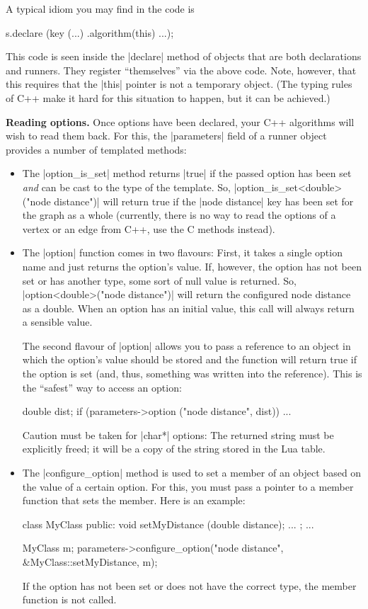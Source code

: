 A typical idiom you may find in the code is
\begin{codeexample}
s.declare (key (...)
           .algorithm(this)
           ...);  
\end{codeexample}
This code is seen inside the |declare| method of objects that are both
declarations and runners. They register ``themselves'' via the above
code. Note, however, that this requires that the |this| pointer is not
a temporary object. (The typing rules of C++ make it hard for this
situation to happen, but it can be achieved.)


\medskip
\noindent\textbf{Reading options.}
Once options have been declared, your C++ algorithms will wish to read
them back. For this, the |parameters| field of a runner object
provides a number of templated methods:
\begin{itemize}
\item The |option_is_set| method returns |true| if the passed option
  has been set \emph{and} can be cast to the type of the template. So,
  |option_is_set<double>("node distance")| will return true if the
  |node distance| key has been set for the graph as a whole
  (currently, there is no way to read the options of a vertex or an
  edge from C++, use the C methods instead).
\item The |option| function comes in two flavours: First, it takes a
  single option name and just returns the option's value. If, however,
  the option has not been set or has another type, some sort of null
  value is returned. So, |option<double>("node distance")| will return
  the configured node distance as a double. When an option has an
  initial value, this call will always return a sensible value.

  The second flavour of |option| allows you to pass a reference to an
  object in which the option's value should be stored and the function
  will return true if the option is set (and, thus, something was
  written into the reference). This is the ``safest'' way to access
  an option:
\begin{codeexample}
double dist;
if (parameters->option ("node distance", dist))
  ...
\end{codeexample}  
  
  Caution must be taken for |char*| options: The returned string must
  be explicitly freed; it will be a copy of the string stored in the
  Lua table.
\item
  The |configure_option| method is used to set a member of an object
  based on the value of a certain option. For this, you must pass a
  pointer to a member function that sets the member. Here is an
  example:
\begin{codeexample}
class MyClass {
public:
  void setMyDistance (double distance);
...
};
...

MyClass m;
parameters->configure_option("node distance", &MyClass::setMyDistance, m);
\end{codeexample}
  If the option has not been set or does not have the correct type,
  the member function is not called.
\end{itemize}


